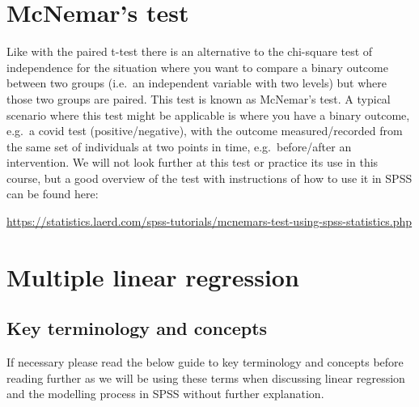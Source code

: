 \documentclass[
]{book}
\begin{document}
\hypertarget{mcnemars-test}{%
\chapter{McNemar's test}\label{mcnemars-test}}

Like with the paired t-test there is an alternative to the chi-square test of independence for the situation where you want to compare a binary outcome between two groups (i.e.~an independent variable with two levels) but where those two groups are paired. This test is known as McNemar's test. A typical scenario where this test might be applicable is where you have a binary outcome, e.g.~a covid test (positive/negative), with the outcome measured/recorded from the same set of individuals at two points in time, e.g.~before/after an intervention. We will not look further at this test or practice its use in this course, but a good overview of the test with instructions of how to use it in SPSS can be found here:

\url{https://statistics.laerd.com/spss-tutorials/mcnemars-test-using-spss-statistics.php}

\hypertarget{multiple-linear-regression}{%
\chapter{Multiple linear regression}\label{multiple-linear-regression}}

\hypertarget{key-terminology-and-concepts}{%
\section{Key terminology and concepts}\label{key-terminology-and-concepts}}

If necessary please read the below guide to key terminology and concepts before reading further as we will be using these terms when discussing linear regression and the modelling process in SPSS without further explanation.
\end{document}
